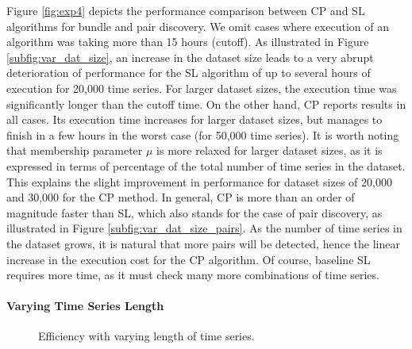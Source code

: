 Figure \ref{fig:exp4} depicts the performance comparison between CP and SL algorithms for bundle and pair discovery. We omit cases where execution of an algorithm was taking more than 15 hours (cutoff). As illustrated in Figure \ref{subfig:var_dat_size}, an increase in the dataset size leads to a very abrupt deterioration of performance for the SL algorithm of up to several hours of execution for 20,000 time series. For larger dataset sizes, the execution time was significantly longer than the cutoff time. On the other hand, CP reports results in all cases. Its execution time increases for larger dataset sizes, but manages to finish in a few hours in the worst case (for 50,000 time series). It is worth noting that membership parameter $\mu$ is more relaxed for larger dataset sizes, as it is expressed in terms of percentage of the total number of time series in the dataset. This explains the slight improvement in performance  for dataset sizes of 20,000 and 30,000 for the CP method. In general, CP is more than an order of magnitude faster than SL, which also stands for the case of pair discovery, as illustrated in Figure \ref{subfig:var_dat_size_pairs}. As the number of time series in the dataset grows, it is natural that more pairs will be detected, hence the linear increase in the execution cost for the CP algorithm. Of course, baseline SL requires more time, as it must check many more combinations of time series.

\paragraph{Varying Time Series Length}
\begin{figure}[!tb]
 \centering
 \caption{Efficiency with varying length of time series.}
 \label{fig:exp5}
\end{figure}

